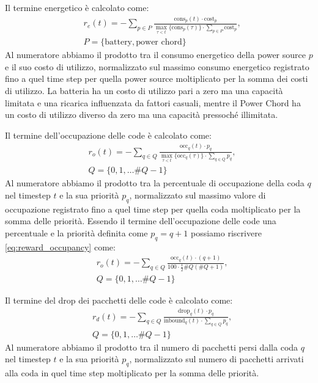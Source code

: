 \documentclass[conference]{IEEEtran}
\begin{document}
Il termine energetico è calcolato come:
\begin{equation}
    \label{eq:reward_energy}
    \begin{aligned}
        & r_e(t) = -\sum_{p \in P}\frac{\text{cons}_p(t) \cdot \text{cost}_p}{\max_{\tau < t}\{\text{cons}_p(\tau)\} \cdot \sum_{p \in P}\text{cost}_p},\\
        & P = \{\text{battery}, \text{power chord}\} 
    \end{aligned}
\end{equation}
Al numeratore abbiamo il prodotto tra il consumo energetico della power source $p$ e il
suo costo di utilizzo, normalizzato sul massimo consumo energetico registrato fino
a quel time step per quella power source moltiplicato per la somma dei costi di utilizzo.
La batteria
ha un costo di utilizzo pari a zero ma una capacità limitata e una ricarica influenzata
da fattori casuali, mentre il Power Chord ha un costo di utilizzo diverso da zero ma
una capacità pressoché illimitata.

Il termine dell'occupazione delle code è calcolato come:
\begin{equation}
    \label{eq:reward_occupancy}
    \begin{aligned}
        & r_o(t) = -\sum_{q \in Q}\frac{\text{occ}_q(t) \cdot p_q}{\max_{\tau < t}\{\text{occ}_q(\tau)\} \cdot \sum_{q \in Q}p_q},\\
        & Q = \{0, 1, \dots \#Q - 1\} 
    \end{aligned}
\end{equation}
Al numeratore abbiamo il prodotto tra la percentuale di occupazione della coda $q$ nel 
timestep $t$ e la sua priorità $p_q$, normalizzato sul massimo valore di occupazione
registrato fino a quel time step per quella coda moltiplicato per la somma delle priorità. 
Essendo il termine dell'occupazione delle code una percentuale e la priorità definita
come $p_q = q + 1$ possiamo riscrivere \autoref{eq:reward_occupancy} come:
\begin{equation}
    \label{eq:reward_occupancy_simplified}
    \begin{aligned}
        & r_o(t) = -\sum_{q \in Q}\frac{\text{occ}_q(t) \cdot (q + 1)}{100 \cdot \frac{1}{2}\#Q(\#Q + 1)},\\
        & Q = \{0, 1, \dots \#Q - 1\} 
    \end{aligned}
\end{equation}

Il termine del drop dei pacchetti delle code è calcolato come:
\begin{equation}
    \label{eq:reward_drop}
    \begin{aligned}
        & r_d(t) = -\sum_{q \in Q}\frac{\text{drop}_q(t) \cdot p_q}{\text{inbound}_q(t) \cdot \sum_{q \in Q}p_q},\\
        & Q = \{0, 1, \dots \#Q - 1\} 
    \end{aligned}
\end{equation}
Al numeratore abbiamo il prodotto tra il numero di pacchetti persi dalla coda $q$ nel 
timestep $t$ e la sua priorità $p_q$, normalizzato sul numero di pacchetti arrivati alla coda in quel time step moltiplicato per la somma delle priorità.
\end{document}
